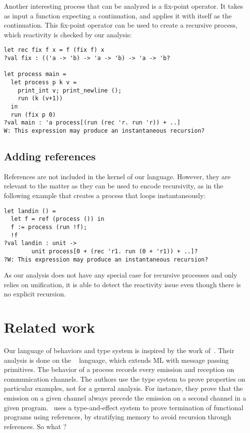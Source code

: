 \documentclass[9pt,preprint]{sigplanconf}
\newcommand{\todo}[1]{ {\color{red} #1}}
\begin{document}
Another interesting process that can be analyzed is a fix-point operator. It takes as input a function expecting a continuation, and applies it with itself as the continuation. This fix-point operator can be used to create a recursive process, which reactivity is checked by our analysis:
\begin{lstlisting}
let rec fix f x = f (fix f) x
?val fix : (('a -> 'b) -> 'a -> 'b) -> 'a -> 'b?

let process main =
  let process p k v =
    print_int v; print_newline (); 
    run (k (v+1))
  in
  run (fix p 0)
?val main : 'a process[(run (rec 'r. run 'r)) + ..]
W: This expression may produce an instantaneous recursion?
\end{lstlisting}

\subsection{Adding references}

References are not included in the kernel of our language. However, they are relevant to the matter as they can be used to encode recursivity, as in the following example that creates a process that loops instantaneously:
%
\begin{lstlisting}
let landin () =
  let f = ref (process ()) in
  f := process (run !f);
  !f
?val landin : unit -> 
        unit process[0 + (rec 'r1. run (0 + 'r1)) + ..]?
?W: This expression may produce an instantaneous recursion?
\end{lstlisting}
%
As our analysis does not have any special case for recursive processes and only relies on unification, it is able to detect the reactivity issue even though there is no explicit recursion.

\section{Related work}
\label{sec:related_work}


Our language of behaviors and type system is inspired by the work of~\cite{Amtoft:1999}. Their analysis is done on the \cml~\cite{Reppy:2007} language, which extends ML with message passing primitives. The behavior of a process records every emission and reception on communication channels. The authors use the type system to prove properties on particular examples, not for a general analysis. For instance, they prove that the emission on a given channel always precede the emission on a second channel in a given program. \cite{Boudol:2010}~uses a type-and-effect system to prove termination of functional programs using references, by stratifying memory to avoid recursion through references.\todo{So what ?}
\end{document}
